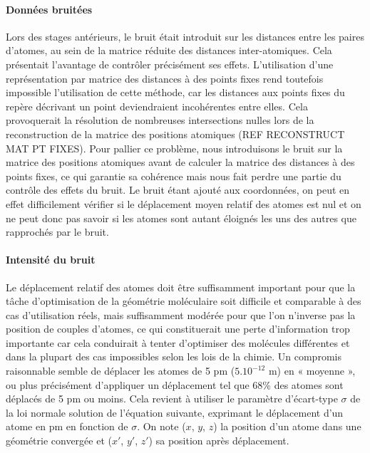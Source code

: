 \paragraph{Données bruitées} Lors des stages antérieurs, le bruit était introduit sur les distances entre les paires d'atomes, au sein de la matrice réduite des distances inter-atomiques. Cela présentait l'avantage de contrôler précisément ses effets. L'utilisation d'une représentation par matrice des distances à des points fixes rend toutefois impossible l'utilisation de cette méthode, car les distances aux points fixes du repère décrivant un point deviendraient incohérentes entre elles. Cela provoquerait la résolution de nombreuses intersections nulles lors de la reconstruction de la matrice des positions atomiques (REF RECONSTRUCT MAT PT FIXES). Pour pallier ce problème, nous introduisons le bruit sur la matrice des positions atomiques avant de calculer la matrice des distances à des points fixes, ce qui garantie sa cohérence mais nous fait perdre une partie du contrôle des effets du bruit. Le bruit étant ajouté aux coordonnées, on peut en effet difficilement vérifier si le déplacement moyen relatif des atomes est nul et on ne peut donc pas savoir si les atomes sont autant éloignés les uns des autres que rapprochés par le bruit.\\

\paragraph{Intensité du bruit} Le déplacement relatif des atomes doit être suffisamment important pour que la tâche d'optimisation de la géométrie moléculaire soit difficile et comparable à des cas d'utilisation réels, mais suffisamment modérée pour que l'on n'inverse pas la position de couples d'atomes, ce qui constituerait une perte d'information trop importante car cela conduirait à tenter d'optimiser des molécules différentes et dans la plupart des cas impossibles selon les lois de la chimie. Un compromis raisonnable semble de déplacer les atomes de 5 pm ($5.10^{-12}$ m) en « moyenne », ou plus précisément d'appliquer un déplacement tel que 68\% des atomes sont déplacés de 5 pm ou moins. Cela revient à utiliser le paramètre d'écart-type $\sigma$ de la loi normale solution de l'équation suivante, exprimant le déplacement d'un atome en pm en fonction de $\sigma$. On note ($x$, $y$, $z$) la position d'un atome dans une géométrie convergée et ($x'$, $y'$, $z'$) sa position après déplacement.

